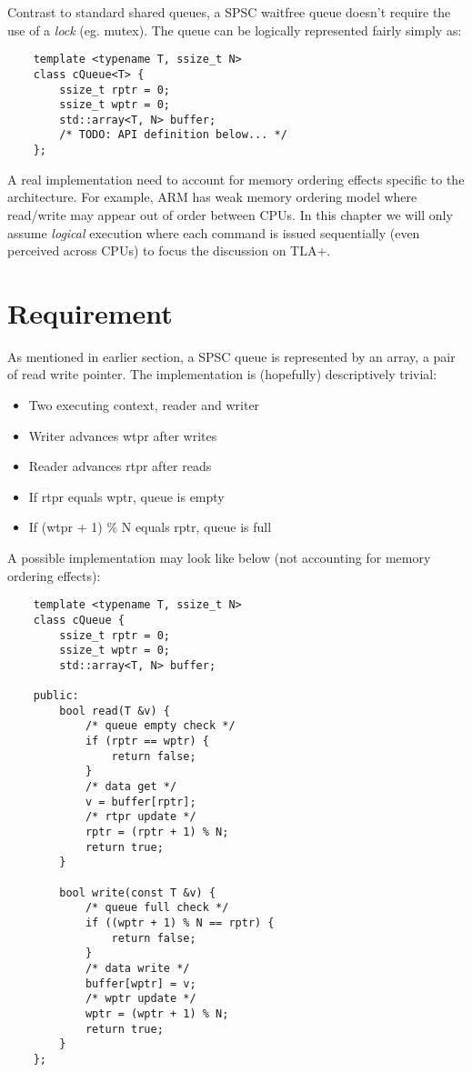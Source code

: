 \documentclass{report}
\begin{document}
Contrast to standard shared queues, a SPSC waitfree queue doesn't require the
use of a \textit{lock} (eg. mutex). The queue can be logically represented
fairly simply as:

\begin{lstlisting}
    template <typename T, ssize_t N>
    class cQueue<T> { 
        ssize_t rptr = 0; 
        ssize_t wptr = 0; 
        std::array<T, N> buffer;
        /* TODO: API definition below... */
    };
\end{lstlisting}

A real implementation need to account for memory ordering effects specific to
the architecture. For example, ARM has weak memory ordering model where
read/write may appear out of order between CPUs. In this chapter we will only
assume \textit{logical} execution where each command is issued sequentially
(even perceived across CPUs) to focus the discussion on TLA+.
\section{Requirement}

As mentioned in earlier section, a SPSC queue is represented by an array, a pair
of read write pointer. The implementation is (hopefully) descriptively trivial:

\begin{itemize}
    \item Two executing context, reader and writer
    \item Writer advances wtpr after writes
    \item Reader advances rtpr after reads
    \item If rtpr equals wptr, queue is empty
    \item If (wtpr + 1) \% N equals rptr, queue is full
\end{itemize}

A possible implementation may look like below (not accounting for memory
ordering effects):
\begin{lstlisting}
    template <typename T, ssize_t N>
    class cQueue { 
        ssize_t rptr = 0;
        ssize_t wptr = 0; 
        std::array<T, N> buffer;

    public:
        bool read(T &v) { 
            /* queue empty check */
            if (rptr == wptr) { 
                return false;
            }
            /* data get */
            v = buffer[rptr]; 
            /* rtpr update */
            rptr = (rptr + 1) % N;
            return true;
        }

        bool write(const T &v) { 
            /* queue full check */
            if ((wptr + 1) % N == rptr) { 
                return false;
            }
            /* data write */
            buffer[wptr] = v;
            /* wptr update */
            wptr = (wptr + 1) % N;
            return true;
        }
    };
\end{lstlisting}
\end{document}
